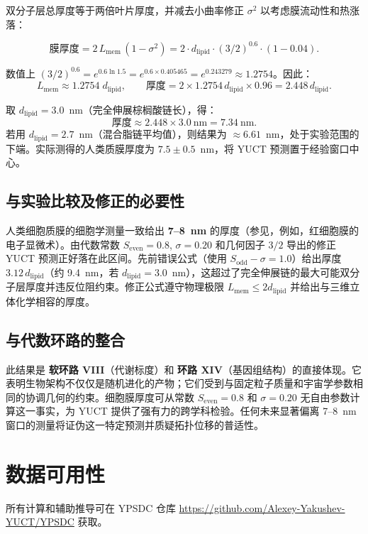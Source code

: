 \documentclass[12pt,a4paper]{article}
\begin{document}
	双分子层总厚度等于两倍叶片厚度，并减去小曲率修正 \(\sigma^2\) 以考虑膜流动性和热涨落：
	
	\[
	\text{膜厚度} = 2 \, L_{\mathrm{mem}} \, (1 - \sigma^2)
	= 2 \cdot d_{\mathrm{lipid}} \cdot (3/2)^{0.6} \cdot (1 - 0.04).
	\]
	
	数值上 \((3/2)^{0.6} = e^{0.6 \ln 1.5} = e^{0.6 \times 0.405465} = e^{0.243279} \approx 1.2754\)。因此：
	\[
	L_{\mathrm{mem}} \approx 1.2754 \; d_{\mathrm{lipid}}, \qquad
	\text{厚度} = 2 \times 1.2754 \, d_{\mathrm{lipid}} \times 0.96 = 2.448 \, d_{\mathrm{lipid}}.
	\]
	
	取 \(d_{\mathrm{lipid}} = 3.0\)~nm（完全伸展棕榈酸链长），得：
	\[
	\text{厚度} \approx 2.448 \times 3.0\ \text{nm} = 7.34\ \text{nm}.
	\]
	若用 \(d_{\mathrm{lipid}} = 2.7\)~nm（混合脂链平均值），则结果为 \(\approx 6.61\)~nm，处于实验范围的下端。实际测得的人类质膜厚度为 \(7.5 \pm 0.5\)~nm，将 YUCT 预测置于经验窗口中心。
	
	\subsection*{与实验比较及修正的必要性}
	
	人类细胞质膜的细胞学测量一致给出 \textbf{7–8~nm} 的厚度（参见，例如，红细胞膜的电子显微术）。由代数常数 \(S_{\mathrm{even}} = 0.8\), \(\sigma = 0.20\) 和几何因子 \(3/2\) 导出的修正 YUCT 预测正好落在此区间。先前错误公式（使用 \(S_{\mathrm{odd}}-\sigma = 1.0\)）给出厚度 \(3.12 \, d_{\mathrm{lipid}}\)（约 9.4~nm，若 \(d_{\mathrm{lipid}}=3.0\)~nm），这超过了完全伸展链的最大可能双分子层厚度并违反位阻约束。修正公式遵守物理极限 \(L_{\mathrm{mem}} \le 2 d_{\mathrm{lipid}}\) 并给出与三维立体化学相容的厚度。
	
	\subsection*{与代数环路的整合}
	
	此结果是 \textbf{软环路 VIII}（代谢标度）和 \textbf{环路 XIV}（基因组结构）的直接体现。它表明生物架构不仅仅是随机进化的产物；它们受到与固定粒子质量和宇宙学参数相同的协调几何的约束。细胞膜厚度可从常数 \(S_{\mathrm{even}} = 0.8\) 和 \(\sigma = 0.20\) 无自由参数计算这一事实，为 YUCT 提供了强有力的跨学科检验。任何未来显著偏离 7–8~nm 窗口的测量将证伪这一特定预测并质疑拓扑位移的普适性。
	
	\section*{数据可用性}
	所有计算和辅助推导可在 YPSDC 仓库 \url{https://github.com/Alexey-Yakushev-YUCT/YPSDC} 获取。
	
\end{document}

